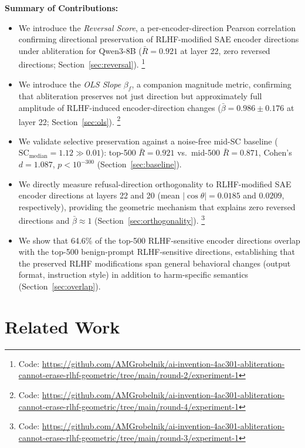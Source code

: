 \documentclass[11pt,letterpaper]{article}
\begin{document}
\medskip
\noindent\textbf{Summary of Contributions:}
\begin{itemize}
  \item We introduce the \emph{Reversal Score}, a per-encoder-direction Pearson correlation confirming
    directional preservation of RLHF-modified SAE encoder directions under abliteration for Qwen3-8B
    ($\bar{R} = 0.921$ at layer 22, zero reversed directions; Section~\ref{sec:reversal}).%
    \footnote{Code: \url{https://github.com/AMGrobelnik/ai-invention-4ac301-abliteration-cannot-erase-rlhf-geometric/tree/main/round-2/experiment-1}}

  \item We introduce the \emph{OLS Slope} $\beta_f$, a companion magnitude metric, confirming that
    abliteration preserves not just direction but approximately full amplitude of RLHF-induced
    encoder-direction changes ($\bar{\beta} = 0.986 \pm 0.176$ at layer 22; Section~\ref{sec:ols}).%
    \footnote{Code: \url{https://github.com/AMGrobelnik/ai-invention-4ac301-abliteration-cannot-erase-rlhf-geometric/tree/main/round-4/experiment-1}}

  \item We validate selective preservation against a noise-free mid-SC baseline
    ($\text{SC}_{\text{median}} = 1.12 \gg 0.01$): top-500 $\bar{R} = 0.921$ vs.\ mid-500
    $\bar{R} = 0.871$, Cohen's $d = 1.087$, $p < 10^{-300}$ (Section~\ref{sec:baseline}).

  \item We directly measure refusal-direction orthogonality to RLHF-modified SAE encoder directions
    at layers 22 and 20 (mean $|\cos\theta| = 0.0185$ and $0.0209$, respectively), providing the
    geometric mechanism that explains zero reversed directions and $\bar{\beta} \approx 1$
    (Section~\ref{sec:orthogonality}).%
    \footnote{Code: \url{https://github.com/AMGrobelnik/ai-invention-4ac301-abliteration-cannot-erase-rlhf-geometric/tree/main/round-3/experiment-1}}

  \item We show that 64.6\% of the top-500 RLHF-sensitive encoder directions overlap with the
    top-500 benign-prompt RLHF-sensitive directions, establishing that the preserved RLHF
    modifications span general behavioral changes (output format, instruction style) in addition to
    harm-specific semantics (Section~\ref{sec:overlap}).
\end{itemize}

\section{Related Work}
\end{document}
